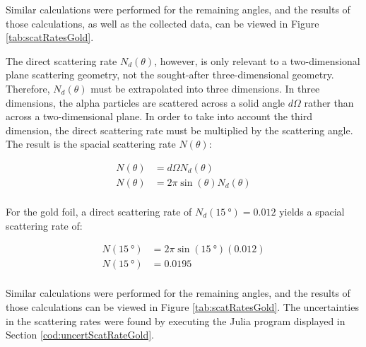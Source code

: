 \documentclass[a4paper]{article}
\begin{document}
Similar calculations were performed for the remaining angles, and the results of
those calculations, as well as the collected data, can be viewed in Figure
\ref{tab:scatRatesGold}.

\qq The direct scattering rate \( N_d (\theta) \), however, is only relevant to
a two-dimensional plane scattering geometry, not the sought-after
three-dimensional geometry. Therefore, \( N_d (\theta) \) must be extrapolated
into three dimensions. In three dimensions, the alpha particles are scattered
across a solid angle \( d\Omega \) rather than across a two-dimensional
plane. In order to take into account the third dimension, the direct scattering
rate must be multiplied by the scattering angle. The result is the spacial
scattering rate \( N (\theta) \):

\begin{align*}
  N (\theta) &= d\Omega N_d (\theta) \\
  N (\theta) &= 2 \pi \sin{(\theta)} N_d (\theta) \\
\end{align*} 

\qq For the gold foil, a direct scattering rate of \( N_d (\SI{15}{\degree}) =
\num{0.012} \) yields a spacial scattering rate of:

\begin{align*}
  N (\SI{15}{\degree}) &= 2 \pi \sin{(\SI{15}{\degree})} (\num{0.012}) \\
  N (\SI{15}{\degree}) &= \num{0.0195} \\
\end{align*}

Similar calculations were performed for the remaining angles, and the results of
those calculations can be viewed in Figure \ref{tab:scatRatesGold}. The
uncertainties in the scattering rates were found by executing the Julia program
displayed in Section \ref{cod:uncertScatRateGold}.
\end{document}

